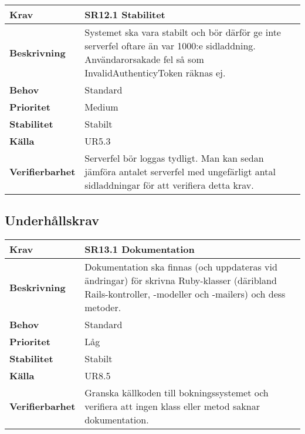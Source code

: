 \documentclass[a4paper, twoside, 11pt, titlepage]{article}
\begin{document}
	\begin {table} [ht] \begin{tabular} { p{2.6cm} p{12.5cm} }
		\hline
		\sffamily\textbf{Krav} & \sffamily\textbf{SR12.1 Stabilitet } \\
		\hline
		\sffamily\textbf{Beskrivning} & Systemet ska vara stabilt och bör därför ge inte serverfel oftare än var 1000:e sidladdning. Användarorsakade fel så som InvalidAuthenticyToken räknas ej.  \\
		\hline
		\sffamily\textbf{Behov} & Standard  \\
		\hline
		\sffamily\textbf{Prioritet} & Medium  \\
		\hline
		\sffamily\textbf{Stabilitet} & Stabilt  \\
		\hline
		\sffamily\textbf{Källa} & UR5.3  \\
		\hline
		\sffamily\textbf{Verifierbarhet} & Serverfel bör loggas tydligt. Man kan sedan jämföra antalet serverfel med ungefärligt antal sidladdningar för att verifiera detta krav.  \\
		\hline
	\end{tabular} \end{table} \FloatBarrier


	\subsection{Underhållskrav}


	\begin {table} [ht] \begin{tabular} { p{2.6cm} p{12.5cm} }
		\hline
		\sffamily\textbf{Krav} & \sffamily\textbf{SR13.1 Dokumentation } \\
		\hline
		\sffamily\textbf{Beskrivning} & Dokumentation ska finnas (och uppdateras vid ändringar) för skrivna Ruby-klasser (däribland Rails-kontroller, -modeller och -mailers) och dess metoder.  \\
		\hline
		\sffamily\textbf{Behov} & Standard  \\
		\hline
		\sffamily\textbf{Prioritet} & Låg  \\
		\hline
		\sffamily\textbf{Stabilitet} & Stabilt  \\
		\hline
		\sffamily\textbf{Källa} & UR8.5  \\
		\hline
		\sffamily\textbf{Verifierbarhet} & Granska källkoden till bokningssystemet och verifiera att ingen  klass eller metod saknar dokumentation.  \\
		\hline
	\end{tabular} \end{table} \FloatBarrier
	\vspace{6mm}
\end{document}
